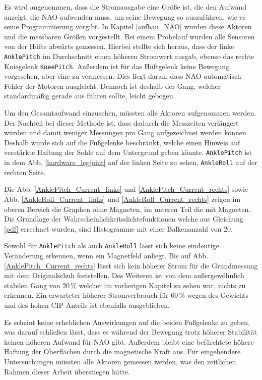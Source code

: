 Es wird angenommen, dass die Stromausgabe eine Größe ist, die den Aufwand anzeigt, die NAO aufwenden muss, um seine Bewegung so auszuführen, wie es seine Programmierung vorgibt. In Kapitel \ref{aufbau_NAO} wurden diese Aktoren und die messbaren Größen vorgestellt. Bei einem Probelauf wurden alle Sensoren von der Hüfte abwärts gemessen. Hierbei stellte sich heraus, dass der linke \texttt{AnklePitch} im Durchschnitt einen höheren Stromwert ausgab, ebenso das rechte Kniegelenk \texttt{KneePitch}. Außerdem ist für das Hüftgelenk keine Bewegung vorgesehen, aber eine zu vermessen. Dies liegt daran, dass NAO automatisch Fehler der Motoren ausgleicht. Dennoch ist deshalb der Gang, welcher standardmäßig gerade aus führen sollte, leicht gebogen. 

Um den Gesamtaufwand einzusehen, müssten alle Aktoren aufgenommen werden. Der Nachteil bei dieser Methode ist, dass dadurch die Messzeiten verlängert würden und damit weniger Messungen pro Gang aufgezeichnet werden können. Deshalb wurde sich auf die Fußgelenke beschränkt, welche einen Hinweis auf verstärkte Haftung der Sohle auf dem Untergrund geben könnte. \texttt{AnklePitch} ist in dem Abb. \ref{hardware_legjoint} auf der linken Seite zu sehen, \texttt{AnkleRoll} auf der rechten Seite. 

Die Abb. \ref{AnklePitch_Current_links} und \ref{AnklePitch_Current_rechts} sowie Abb. \ref{AnkleRoll_Current_links} und \ref{AnkleRoll_Current_rechts} zeigen im oberen Bereich die Graphen ohne Magneten, im unteren Teil die mit Magneten. Die Grundlage der Wahrscheinlichkeitsdichtefunktionen welche aus Gleichung \eqref{pdf} errechnet wurden, sind Histogramme mit einer Balkenanzahl von 20.

Sowohl für \texttt{AnklePitch} als auch \texttt{AnkleRoll} lässt sich keine eindeutige Veränderung erkennen, wenn ein Magnetfeld anliegt. Bis auf Abb. \ref{AnklePitch_Current_rechts} lässt sich kein höherer Strom für die Grundmessung mit dem Originalschuh feststellen. Des Weiteren ist von dem außergewöhnlich stabilen Gang von $20\,\%$ welcher im vorherigen Kapitel zu sehen war, nichts zu erkennen. Ein erwarteter höherer Stromverbrauch für $60\,\%$ wegen des Gewichts und des hohen CIP Anteils ist ebenfalls ausgeblieben. 

Es scheint keine erheblichen Auswirkungen auf die beiden Fußgelenke zu geben, was darauf schließen lässt, dass es während der Bewegung trotz höherer Stabilität keinen höheren Aufwand für NAO gibt. Außerdem bleibt eine befürchtete höhere Haftung der Oberflächen durch die magnetische Kraft aus. Für eingehendere Untersuchungen müssten alle Aktoren gemessen werden, was den zeitlichen Rahmen dieser Arbeit überstiegen hätte. 

